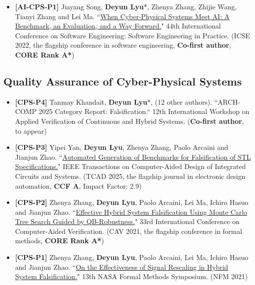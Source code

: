 \documentclass[11pt,a4paper]{moderncv}        %
\newcommand{\highlight}[1]{\textcolor{deepPurple}{\textbf{#1}}}
\begin{document}
\begin{itemize}
    \item \hypertarget{pub:AI-CPS-P1}{}\textbf{[AI-CPS-P1]} Jiayang Song, \textbf{Deyun Lyu}*, Zhenya Zhang, Zhijie Wang, Tianyi Zhang and Lei Ma. ``\href{https://dl.acm.org/doi/10.1145/3510457.3513049}{When Cyber-Physical Systems Meet AI: A Benchmark, an Evaluation, and a Way Forward.}" 44th International Conference on Software Engineering: Software Engineering in Practice. (ICSE 2022, the flagship conference in software engineering, \highlight{Co-first author}, \highlight{CORE Rank A*})
\end{itemize}

\subsection{Quality Assurance of Cyber-Physical Systems}

\begin{itemize}
    \item \textbf{[CPS-P4]} Tanmay Khandait, \textbf{Deyun Lyu}*, (12 other authors). ``ARCH-COMP 2025 Category Report: Falsification.`` 12th International Workshop on Applied Verification of Continuous and Hybrid Systems. (\highlight{Co-first author}, to appear)
    \item \hypertarget{pub:CPS-P3}{}\textbf{[CPS-P3]} Yipei Yan, \textbf{Deyun Lyu}, Zhenya Zhang, Paolo Arcaini and Jianjun Zhao. ``\href{https://ieeexplore.ieee.org/document/10922764}{Automated Generation of Benchmarks for Falsification of STL Specifications.}" IEEE Transactions on Computer-Aided Design of Integrated Circuits and Systems. (TCAD 2025, the flagship journal in electronic design automation, \highlight{CCF A}, Impact Factor: 2.9)
    \item \hypertarget{pub:CPS-P2}{}\textbf{[CPS-P2]} Zhenya Zhang, \textbf{Deyun Lyu}, Paolo Arcaini, Lei Ma, Ichiro Hasuo and Jianjun Zhao. ``\href{https://link.springer.com/chapter/10.1007/978-3-030-81685-8_29}{Effective Hybrid System Falsification Using Monte Carlo Tree Search Guided by QB-Robustness.}" 33rd International Conference on Computer-Aided Verification. (CAV 2021, the flagship conference in formal methods, \highlight{CORE Rank A*})
    \item \textbf{[CPS-P1]} Zhenya Zhang, \textbf{Deyun Lyu}, Paolo Arcaini, Lei Ma, Ichiro Hasuo and Jianjun Zhao. ``\href{https://link.springer.com/chapter/10.1007/978-3-030-76384-8_24}{On the Effectiveness of Signal Rescaling in Hybrid System Falsification.}" 13th NASA Formal Methods Symposium. (NFM 2021)
\end{itemize}
\end{document}
